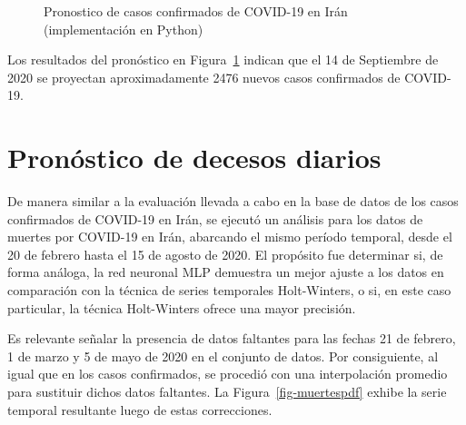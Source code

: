 \documentclass[
  us-letterpaper,
]{scrreprt}
\theoremstyle{plain}
\theoremstyle{definition}
\theoremstyle{plain}
\theoremstyle{definition}
\theoremstyle{remark}
\begin{document}
\begin{figure}


\caption{\label{fig-mlp1}Pronostico de casos confirmados de COVID-19 en
Irán (implementación en Python)}

\end{figure}%

Los resultados del pronóstico en Figura~\ref{fig-mlp1} indican que el 14
de Septiembre de 2020 se proyectan aproximadamente 2476 nuevos casos
confirmados de COVID-19.

\chapter{Pronóstico de decesos
diarios}\label{pronuxf3stico-de-decesos-diarios}

De manera similar a la evaluación llevada a cabo en la base de datos de
los casos confirmados de COVID-19 en Irán, se ejecutó un análisis para
los datos de muertes por COVID-19 en Irán, abarcando el mismo período
temporal, desde el 20 de febrero hasta el 15 de agosto de 2020. El
propósito fue determinar si, de forma análoga, la red neuronal MLP
demuestra un mejor ajuste a los datos en comparación con la técnica de
series temporales Holt-Winters, o si, en este caso particular, la
técnica Holt-Winters ofrece una mayor precisión.

Es relevante señalar la presencia de datos faltantes para las fechas 21
de febrero, 1 de marzo y 5 de mayo de 2020 en el conjunto de datos. Por
consiguiente, al igual que en los casos confirmados, se procedió con una
interpolación promedio para sustituir dichos datos faltantes. La
Figura~\ref{fig-muertespdf} exhibe la serie temporal resultante luego de
estas correcciones.
\end{document}
